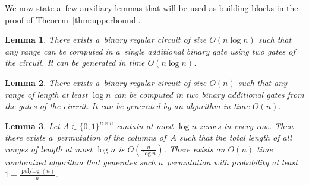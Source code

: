 \documentclass[11pt,letterpaper]{article}
\newtheorem{lemma}{Lemma}
\begin{document}
We now state a~few auxiliary lemmas that will be
used as building blocks in the proof of Theorem~\ref{thm:upperbound}.


\begin{lemma}\label{lemma:decompose}
There exists a~binary regular circuit of size $O(n\log n)$ such that
any range can be computed in a~single additional binary gate
using two gates of the circuit. It can be generated in time
$O(n\log n)$.
\end{lemma}

\begin{lemma}\label{lemma:blocks}
There exists a~binary regular circuit of size $O(n)$ such 
that any range
of length at least $\log n$ can be computed in two binary
additional gates from the gates of the circuit.
It can be generated by an algorithm in time $O(n)$.
\end{lemma}

\begin{lemma}\label{lemma:permute}
Let $A \in \{0,1\}^{n \times n}$ contain at most $\log n$ 
zeroes in every row. Then there exists a~permutation of the 
columns of~$A$
such that the total length of all ranges of length
at most $\log n$ is $O(\frac{n}{\log n})$. 
There exists an $O(n)$ time randomized algorithm that 
generates such a~permutation with probability at least $1-\frac{\operatorname{polylog}(n)}{n}$.
\end{lemma}
\end{document}
